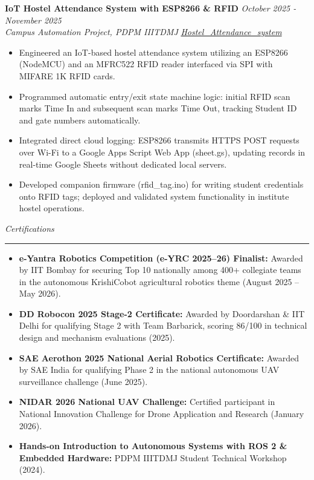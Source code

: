 \documentclass[10pt,a4paper]{article}
\newcommand{\cvsection}[1]{%
  \vspace{7pt}%
  {\color{cvblue}\itshape\large #1}\\[-4pt]%
  {\color{cvblue}\rule{\textwidth}{0.75pt}}\vspace{3pt}%
}
\begin{document}
\vspace{3pt}
\textbf{IoT Hostel Attendance System with ESP8266 \& RFID} \hfill \textit{October 2025 - November 2025}\\
\textit{Campus Automation Project, PDPM IIITDMJ} \hfill \textit{\href{https://github.com/Humobot1812/Hostel_Attendance_system}{Hostel\_Attendance\_system}}
\begin{itemize}[leftmargin=1.2rem,itemsep=1.5pt,topsep=2pt,parsep=0pt]
  \item Engineered an IoT-based hostel attendance system utilizing an ESP8266 (NodeMCU) and an MFRC522 RFID reader interfaced via SPI with MIFARE 1K RFID cards.
  \item Programmed automatic entry/exit state machine logic: initial RFID scan marks Time In and subsequent scan marks Time Out, tracking Student ID and gate numbers automatically.
  \item Integrated direct cloud logging: ESP8266 transmits HTTPS POST requests over Wi-Fi to a Google Apps Script Web App (sheet.gs), updating records in real-time Google Sheets without dedicated local servers.
  \item Developed companion firmware (rfid\_tag.ino) for writing student credentials onto RFID tags; deployed and validated system functionality in institute hostel operations.
\end{itemize}

\cvsection{Certifications}
\begin{itemize}[leftmargin=1.2rem,itemsep=2pt,topsep=2pt,parsep=0pt]
  \item \textbf{e-Yantra Robotics Competition (e-YRC 2025–26) Finalist:} Awarded by IIT Bombay for securing Top 10 nationally among 400+ collegiate teams in the autonomous KrishiCobot agricultural robotics theme (August 2025 – May 2026).
  \item \textbf{DD Robocon 2025 Stage-2 Certificate:} Awarded by Doordarshan \& IIT Delhi for qualifying Stage 2 with Team Barbarick, scoring 86/100 in technical design and mechanism evaluations (2025).
  \item \textbf{SAE Aerothon 2025 National Aerial Robotics Certificate:} Awarded by SAE India for qualifying Phase 2 in the national autonomous UAV surveillance challenge (June 2025).
  \item \textbf{NIDAR 2026 National UAV Challenge:} Certified participant in National Innovation Challenge for Drone Application and Research (January 2026).
  \item \textbf{Hands-on Introduction to Autonomous Systems with ROS 2 \& Embedded Hardware:} PDPM IIITDMJ Student Technical Workshop (2024).
\end{itemize}
\end{document}
